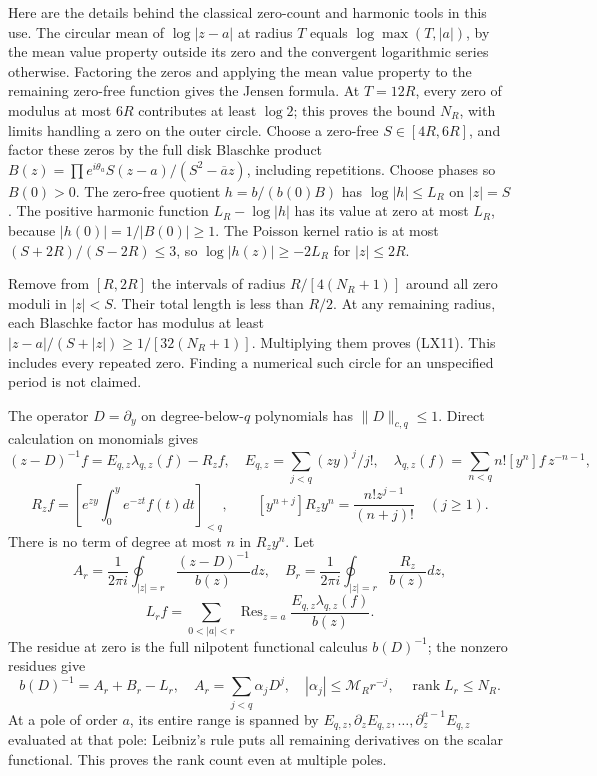 \documentclass[10pt]{article}
\begin{document}
Here are the details behind the classical zero-count and harmonic tools in this use. The circular mean of \(\log|z-a|\) at radius \(T\) equals \(\log\max(T,|a|)\), by the mean value property outside its zero and the convergent logarithmic series otherwise. Factoring the zeros and applying the mean value property to the remaining zero-free function gives the Jensen formula. At \(T=12R\), every zero of modulus at most \(6R\) contributes at least \(\log2\); this proves the bound \(N_R\), with limits handling a zero on the outer circle. Choose a zero-free \(S\in[4R,6R]\), and factor these zeros by the full disk Blaschke product \(B(z)=\prod e^{i\theta_a}S(z-a)/(S^2-\overline a z)\), including repetitions. Choose phases so \(B(0)>0\). The zero-free quotient \(h=b/(b(0)B)\) has \(\log|h|\le L_R\) on \(|z|=S\). The positive harmonic function \(L_R-\log|h|\) has its value at zero at most \(L_R\), because \(|h(0)|=1/|B(0)|\ge1\). The Poisson kernel ratio is at most \((S+2R)/(S-2R)\le3\), so \(\log|h(z)|\ge-2L_R\) for \(|z|\le2R\).

Remove from \([R,2R]\) the intervals of radius \(R/[4(N_R+1)]\) around all zero moduli in \(|z|<S\). Their total length is less than \(R/2\). At any remaining radius, each Blaschke factor has modulus at least \(|z-a|/(S+|z|)\ge1/[32(N_R+1)]\). Multiplying them proves (LX11). This includes every repeated zero. Finding a numerical such circle for an unspecified period is not claimed.

The operator \(D=\partial_y\) on degree-below-\(q\) polynomials has \(\|D\|_{c,q}\le1\). Direct calculation on monomials gives \[
(z-D)^{-1}f=E_{q,z}\lambda_{q,z}(f)-R_zf,
\quad E_{q,z}=\sum_{j<q}(zy)^j/j!,
\quad\lambda_{q,z}(f)=\sum_{n<q}n![y^n]f\,z^{-n-1},
\] \[
R_zf=\left[e^{zy}\int_0^ye^{-zt}f(t)dt\right]_{<q},\qquad
[y^{n+j}]R_zy^n=\frac{n!z^{j-1}}{(n+j)!}\quad(j\ge1).
\tag{LX12}
\] There is no term of degree at most \(n\) in \(R_zy^n\). Let \[
A_r=\frac1{2\pi i}\oint_{|z|=r}\frac{(z-D)^{-1}}{b(z)}dz,
\quad B_r=\frac1{2\pi i}\oint_{|z|=r}\frac{R_z}{b(z)}dz,
\] \[
L_rf=\sum_{0<|a|<r}\operatorname{Res}_{z=a}
\frac{E_{q,z}\lambda_{q,z}(f)}{b(z)}.
\] The residue at zero is the full nilpotent functional calculus \(b(D)^{-1}\); the nonzero residues give \[
b(D)^{-1}=A_r+B_r-L_r,
\quad A_r=\sum_{j<q}\alpha_jD^j,
\quad|\alpha_j|\le\mathcal M_Rr^{-j},\quad
\operatorname{rank}L_r\le N_R.
\tag{LX13}
\] At a pole of order \(a\), its entire range is spanned by \(E_{q,z},\partial_zE_{q,z},\ldots,\partial_z^{a-1}E_{q,z}\) evaluated at that pole: Leibniz's rule puts all remaining derivatives on the scalar functional. This proves the rank count even at multiple poles.
\end{document}
